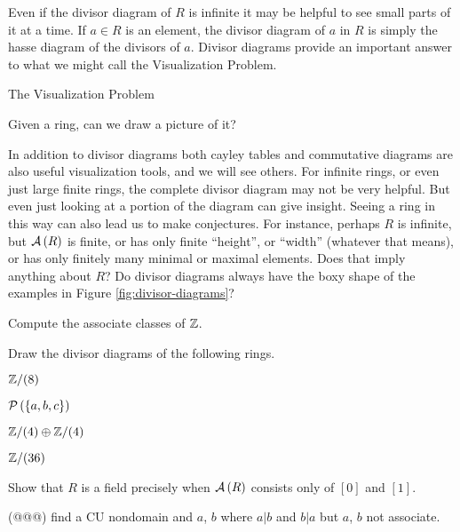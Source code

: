 Even if the divisor diagram of \(R\) is infinite it may be helpful to see small parts of it at a time.
If \(a \in R\) is an element, the divisor diagram of \(a\) in \(R\) is simply the hasse diagram of the divisors of \(a\).
Divisor diagrams provide an important answer to what we might call the Visualization Problem.
\begin{titlebox}{The Visualization Problem}
\begin{center}
Given a ring, can we draw a picture of it?
\end{center}
\end{titlebox}
In addition to divisor diagrams both cayley tables and commutative diagrams are also useful visualization tools, and we will see others.
For infinite rings, or even just large finite rings, the complete divisor diagram may not be very helpful.
But even just looking at a portion of the diagram can give insight.
Seeing a ring in this way can also lead us to make conjectures.
For instance, perhaps \(R\) is infinite, but \( \mathcal{A}\left(R\right) \) is finite, or has only finite ``height'', or ``width'' (whatever that means), or has only finitely many minimal or maximal elements.
Does that imply anything about \(R\)?
Do divisor diagrams always have the boxy shape of the examples in Figure \ref{fig:divisor-diagrams}?



\Exercises%

\begin{exercise}
Compute the associate classes of \(\mathbb{Z}\).
\end{exercise}


\begin{exercise}
Draw the divisor diagrams of the following rings.
\begin{proplist*}
\item \(\mathbb{Z}/(8)\)
\item \(\mathcal{P}\left(\{a,b,c\}\right)\)
\item \(\mathbb{Z}/(4) \oplus \mathbb{Z}/(4)\)
\item \(\mathbb{Z}/(36)\)
\end{proplist*}
\end{exercise}


\begin{exercise}
Show that \(R\) is a field precisely when \( \mathcal{A}\left(R\right) \) consists only of \([0]\) and \([1]\).
\end{exercise}


\begin{exercise}
(@@@) find a CU nondomain and \(a\), \(b\) where \(a|b\) and \(b|a\) but \(a\), \(b\) not associate.
\end{exercise}


